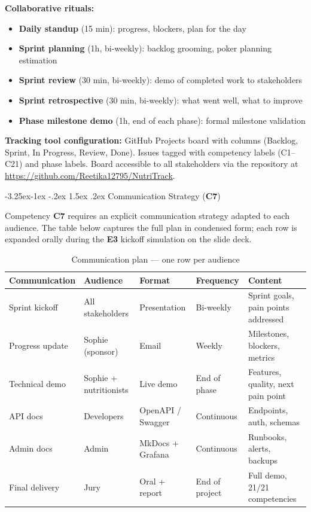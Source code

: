 \documentclass[a4paper,11pt,oneside,openany]{report}
\makeatletter
\renewcommand\subsection{\@startsection{subsection}{2}{\z@}%
  {-3.25ex\@plus -1ex \@minus -.2ex}%
  {1.5ex \@plus .2ex}%
  {\normalfont\large\bfseries\color{ntdarkgreen}}}
\newcommand{\competence}[1]{\textbf{\textcolor{ntgreen}{#1}}}
\newcommand{\evaluation}[1]{\textbf{\textcolor{ntblue}{#1}}}
\makeatother
\begin{document}
\textbf{Collaborative rituals:}
\begin{itemize}[nosep]
  \item \textbf{Daily standup} (15 min): progress, blockers, plan for the day
  \item \textbf{Sprint planning} (1h, bi-weekly): backlog grooming, poker planning estimation
  \item \textbf{Sprint review} (30 min, bi-weekly): demo of completed work to stakeholders
  \item \textbf{Sprint retrospective} (30 min, bi-weekly): what went well, what to improve
  \item \textbf{Phase milestone demo} (1h, end of each phase): formal milestone validation
\end{itemize}

\textbf{Tracking tool configuration:} GitHub Projects board with columns
(Backlog, Sprint, In Progress, Review, Done). Issues tagged with competency
labels (C1--C21) and phase labels. Board accessible to all stakeholders via
the repository at \url{https://github.com/Reetika12795/NutriTrack}.

\subsection{Communication Strategy (\competence{C7})}

Competency \competence{C7} requires an explicit communication
strategy adapted to each audience. The table below captures the
full plan in condensed form; each row is expanded orally during
the \evaluation{E3} kickoff simulation on the slide deck.

\begin{table}[H]
\centering
\caption{Communication plan --- one row per audience}
\label{tab:comms}
\begin{tabularx}{\textwidth}{L{2.5cm} L{2.5cm} L{2cm} L{2cm} L{3.5cm}}
\toprule
\textbf{Communication} & \textbf{Audience} & \textbf{Format} & \textbf{Frequency} & \textbf{Content} \\
\midrule
Sprint kickoff & All stakeholders & Presentation & Bi-weekly & Sprint goals, pain points addressed \\
Progress update & Sophie (sponsor) & Email & Weekly & Milestones, blockers, metrics \\
Technical demo & Sophie + nutritionists & Live demo & End of phase & Features, quality, next pain point \\
API docs & Developers & OpenAPI / Swagger & Continuous & Endpoints, auth, schemas \\
Admin docs & Admin & MkDocs + Grafana & Continuous & Runbooks, alerts, backups \\
Final delivery & Jury & Oral + report & End of project & Full demo, 21/21 competencies \\
\bottomrule
\end{tabularx}
\end{table}
\end{document}
